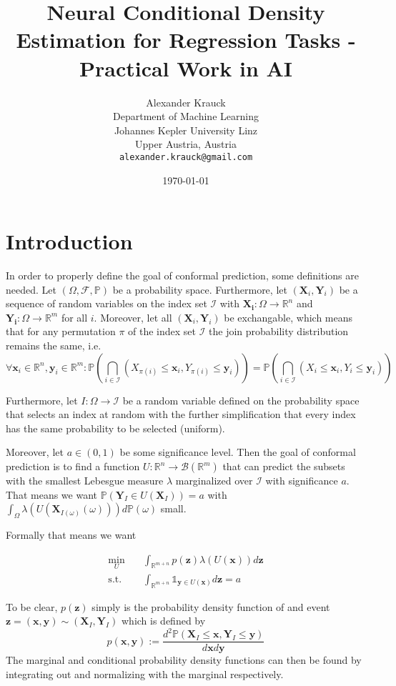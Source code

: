 \documentclass{article}
\title{Neural Conditional Density Estimation for Regression Tasks - Practical Work in AI}
\author{%
  Alexander Krauck \\
  Department of Machine Learning\\
  Johannes Kepler University Linz\\
  Upper Austria, Austria \\
  \texttt{alexander.krauck@gmail.com}
}
\date{\specialdate\today}
\theoremstyle{definition}
\begin{document}
\maketitle

\section{Introduction}

In order to properly define the goal of conformal prediction, some definitions are needed. Let $\left(\Omega, \mathcal{F}, \mathbb{P}\right)$ be a probability space. Furthermore, let $(\mathbf{X}_i, \mathbf{Y}_i)$ be a sequence of random variables on the index set $\mathcal{I}$ with $\mathbf{X_i}: \Omega \to \mathbb{R}^n$ and $\mathbf{Y_i}: \Omega \to \mathbb{R}^m$ for all $i$. Moreover, let all $(\mathbf{X}_i, \mathbf{Y}_i)$ be exchangable, which means that for any permutation $\pi$ of the index set $\mathcal{I}$ the join probability distribution remains the same, i.e. 
$$\forall \mathbf{x}_i \in \mathbb{R}^n, \mathbf{y}_i \in \mathbb{R}^m: \mathbb{P}\left( \bigcap_{i\in\mathcal{I}} (X_{\pi(i)} \leq \mathbf{x}_i, Y_{\pi(i)} \leq \mathbf{y}_i)\right) = \mathbb{P}\left( \bigcap_{i\in\mathcal{I}} (X_{i} \leq \mathbf{x}_i, Y_{i} \leq \mathbf{y}_i)\right)$$

Furthermore, let $I: \Omega \to \mathcal{I}$ be a random variable defined on the probability space that selects an index at random with the further simplification that every index has the same probability to be selected (uniform).

Moreover, let $a \in (0,1)$ be some significance level. Then the goal of conformal prediction is to find a function $U : \mathbb{R}^n \to \mathcal{B}(\mathbb{R}^m)$ that can predict the subsets with the smallest Lebesgue measure $\lambda$ marginalized over $\mathcal{I}$ with significance $a$. That means we want $\mathbb{P}(\mathbf{Y}_I \in U(\mathbf{X}_I)) = a$ with $\int_{\Omega}\lambda(U(\mathbf{X}_{I(\omega)}(\omega))) d\mathbb{P}(\omega)$ small.

Formally that means we want

\begin{align}
\min_U \quad & \int_{\mathbb{R}^{m + n}} p(\mathbf{z}) \lambda(U(\mathbf{x})) d\mathbf{z} \\
\text{s.t.} \quad & \int_{\mathbb{R}^{m + n}} \mathds{1}_{\mathbf{y} \in U(\mathbf{x})} d\mathbf{z} = a
\end{align}

To be clear, $p(\mathbf{z})$ simply is the probability density function of and event $\mathbf{z} = (\mathbf{x}, \mathbf{y}) \sim (\mathbf{X}_I, \mathbf{Y}_I)$ which is defined by 
$$p(\mathbf{x}, \mathbf{y}):=\frac{d^2 \mathbb{P}(\mathbf{X}_I \leq \mathbf{x}, \mathbf{Y}_I \leq \mathbf{y})}{d \mathbf{x} d \mathbf{y}}$$
The marginal and conditional probability density functions can then be found by integrating out and normalizing with the marginal respectively.
\end{document}
